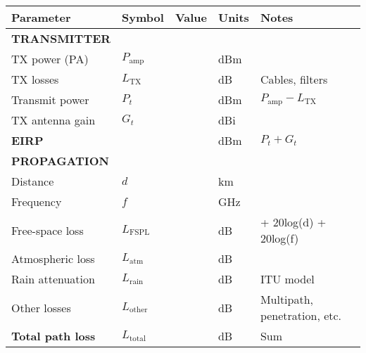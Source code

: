 {\def\LTcaptype{} %
\begin{longtable}[]{@{}
  >{\raggedright\arraybackslash}p{}
  >{\raggedright\arraybackslash}p{}
  >{\raggedright\arraybackslash}p{}
  >{\raggedright\arraybackslash}p{}
  >{\raggedright\arraybackslash}p{}@{}}
\toprule\noalign{}
\begin{minipage}[b]{\linewidth}\raggedright
Parameter
\end{minipage} & \begin{minipage}[b]{\linewidth}\raggedright
Symbol
\end{minipage} & \begin{minipage}[b]{\linewidth}\raggedright
Value
\end{minipage} & \begin{minipage}[b]{\linewidth}\raggedright
Units
\end{minipage} & \begin{minipage}[b]{\linewidth}\raggedright
Notes
\end{minipage} \\
\midrule\noalign{}
\endhead
\bottomrule\noalign{}
\endlastfoot
\textbf{TRANSMITTER} & & & & \\
TX power (PA) & \(P_{\text{amp}}\) & & dBm & \\
TX losses & \(L_{\text{TX}}\) & & dB & Cables, filters \\
Transmit power & \(P_t\) & & dBm & \(P_{\text{amp}} - L_{\text{TX}}\) \\
TX antenna gain & \(G_t\) & & dBi & \\
\textbf{EIRP} & & & dBm & \(P_t + G_t\) \\
\textbf{PROPAGATION} & & & & \\
Distance & \(d\) & & km & \\
Frequency & \(f\) & & GHz & \\
Free-space loss & \(L_{\text{FSPL}}\) & & dB & 32.45 + 20log(d) +
20log(f) \\
Atmospheric loss & \(L_{\text{atm}}\) & & dB & \\
Rain attenuation & \(L_{\text{rain}}\) & & dB & ITU model \\
Other losses & \(L_{\text{other}}\) & & dB & Multipath, penetration,
etc. \\
\textbf{Total path loss} & \(L_{\text{total}}\) & & dB & Sum \\

\end{longtable}}
